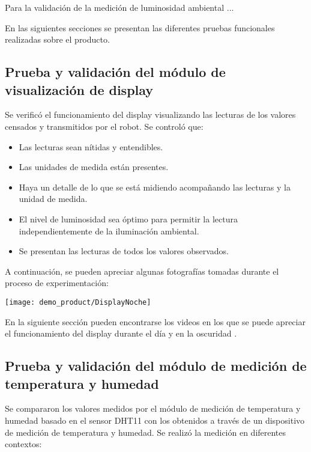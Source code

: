 Para la validación de la medición de luminosidad ambiental ...

En las siguientes secciones se presentan las diferentes pruebas funcionales realizadas sobre el producto.



\subsection{Prueba y validación del módulo de visualización de display}

Se verificó el funcionamiento del display visualizando las lecturas de los valores censados y transmitidos por el robot. Se controló que:

\begin{itemize}
	\item Las lecturas sean nítidas y entendibles.
	\item Las unidades de medida están presentes.
	\item Haya un detalle de lo que se está midiendo acompañando las lecturas y la unidad de medida.
	\item El nivel de luminosidad sea óptimo para permitir la lectura independientemente de la iluminación ambiental.
	\item Se presentan las lecturas de todos los valores observados.
\end{itemize}


A continuación, se pueden apreciar algunas fotografías tomadas durante el proceso de experimentación:

\begin{center}
\texttt{[image: demo\_product/DisplayNoche]}
  \label{fig:DisplayNoche}
\end{center}


En la siguiente sección pueden encontrarse los videos en los que se puede apreciar el funcionamiento del display durante el día \cite{Demo_Mediciones} y en la oscuridad \cite{Demo_Display_Oscuridad}.

\subsection{Prueba y validación del módulo de medición de temperatura y humedad}

Se compararon los valores medidos por el módulo de medición de temperatura y humedad basado en el sensor DHT11 con los obtenidos a través de un dispositivo de medición de temperatura y humedad. Se realizó la medición en diferentes contextos:


